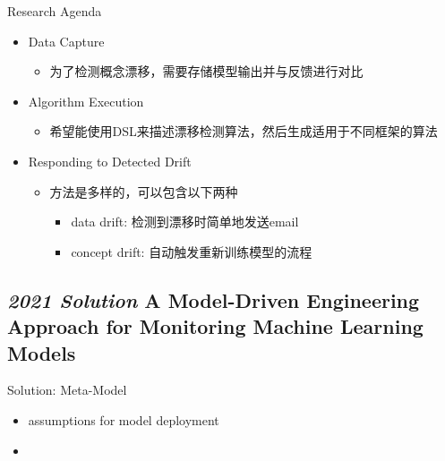 \documentclass{beamer}
\begin{document}
\begin{frame}{Research Agenda}
    \begin{itemize}
        \item Data Capture
        \begin{itemize}
            \item 为了检测概念漂移，需要存储模型输出并与反馈进行对比
        \end{itemize}
        \item Algorithm Execution
        \begin{itemize}
            \item 希望能使用DSL来描述漂移检测算法，然后生成适用于不同框架的算法
        \end{itemize}
        \item Responding to Detected Drift
        \begin{itemize}
            \item 方法是多样的，可以包含以下两种
            \begin{itemize}
                \item data drift: 检测到漂移时简单地发送email
                \item concept drift: 自动触发重新训练模型的流程
            \end{itemize}
        \end{itemize}
    \end{itemize}
\end{frame}
\subsection{\textit{2021 Solution} A Model-Driven Engineering Approach for Monitoring Machine Learning Models}
\begin{frame}{Solution: Meta-Model}
    \begin{itemize}
        \item assumptions for model deployment
        \item 
    \end{itemize}
\end{frame}
\end{document}
